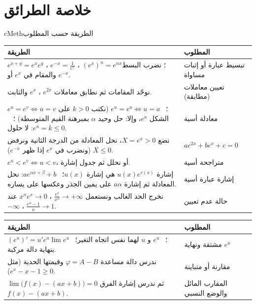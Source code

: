 \documentclass[12pt,a4paper]{article}
\newenvironment{BOX}[2]{\begin{otherlanguage}{english}\begin{arbox}{#1}{#2}}{\end{arbox}\end{otherlanguage}}
\begin{document}
\section{خلاصة الطرائق}
\begin{BOX}{cMeth}{الطريقة حسب المطلوب}
\begin{center}
\renewcommand{\arraystretch}{1.3}
\begin{tabular}{|p{}|p{}|}\hline
\rowcolor{cSec!12} \textbf{الطريقة} & \textbf{المطلوب}\\\hline
$e^{x+y}=e^{x}e^{y}$ ، $e^{-x}=\frac{1}{e^{x}}$ ، $\left(e^{x}\right)^{n}=e^{nx}$؛ نضرب البسط والمقام في $e^{x}$ أو $e^{-x}$. & تبسيط عبارة أو إثبات مساواة\\\hline
نوحّد المقامات ثم نطابق معاملات $e^{2x}$ ، $e^{x}$ والثابت. & تعيين معاملات (مطابقة)\\\hline
$e^{u}=e^{v}\iff u=v$ ؛ \ $e^{u}=e^{a}\iff u=a$ (نكتب $k>0$ على الشكل $e^{a}$، وإلا: حل وحيد $\alpha$ بمبرهنة القيم المتوسطة) ؛ \ $e^{u}=k\leqslant0$: لا حلول. & معادلة أسية\\\hline
نضع $X=e^{x}>0$، نحل المعادلة من الدرجة الثانية ونرفض $X\leqslant0$ (ونضرب في $e^{x}$ إذا ظهر $e^{-x}$). & $ae^{2x}+be^{x}+c=0$\\\hline
$e^{u}<e^{v}\iff u<v$، أو نحلل ثم جدول إشارة. & متراجحة أسية\\\hline
إشارة $u(x)e^{v(x)}$ هي إشارة $u(x)$؛ \ $ae^{\alpha x+\beta}+b$: نحل المعادلة ثم إشارة $a\alpha$ على يمين الجذر وعكسها على يساره. & إشارة عبارة أسية\\\hline
نخرج الحد الغالب ونستعمل $\frac{e^{x}}{x^{n}}\to+\infty$ ، $x^{n}e^{x}\to0$ عند $-\infty$ ، $\frac{e^{u}-1}{u}\to1$. & حالة عدم تعيين\\\hline
\end{tabular}
\end{center}
\begin{center}
\renewcommand{\arraystretch}{1.3}
\begin{tabular}{|p{}|p{}|}\hline
\rowcolor{cSec!12} \textbf{الطريقة} & \textbf{المطلوب}\\\hline
$\left(e^{u}\right)'=u'e^{u}$؛ \ $e^{u}$ و $u$ لهما نفس اتجاه التغير؛ \ $\lim e^{u}$ بنهاية دالة مركبة. & مشتقة ونهاية $e^{u}$\\\hline
ندرس دالة مساعدة $\varphi=A-B$ وقيمتها الحدية (مثل $e^{x}-x-1\geqslant0$). & مقارنة أو متباينة\\\hline
$\lim\big(f(x)-(ax+b)\big)=0$ ثم ندرس إشارة الفرق $f(x)-(ax+b)$. & المقارب المائل والوضع النسبي\\\hline

\end{tabular}
\end{center}
\end{BOX}
\end{document}
